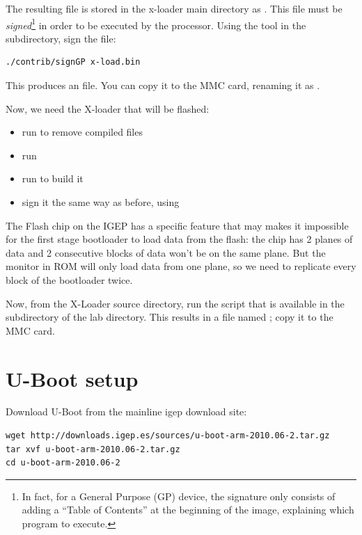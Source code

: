 The resulting file is stored in the x-loader main directory as
. This file must be {\em signed}\footnote{In fact,
  for a General Purpose (GP) device, the signature only consists of
  adding a “Table of Contents” at the beginning of the image,
  explaining which program to execute.} in order to be executed by the
processor. Using the  tool in the 
subdirectory, sign the  file:

\begin{verbatim}
./contrib/signGP x-load.bin
\end{verbatim}

This produces an  file. You can copy it to the
MMC card, renaming it as .

Now, we need the X-loader that will be flashed:

\begin{itemize}

\item run  to remove compiled files
\item run 
\item run  to build it
\item sign it the same way as before, using 

\end{itemize}

The Flash chip on the IGEP has a specific feature that may makes it
impossible for the first stage bootloader to load data from the flash:
the chip has 2 planes of data and 2 consecutive blocks of data won't
be on the same plane. But the monitor in ROM will only load data from
one plane, so we need to replicate every block of the bootloader
twice.

Now, from the X-Loader source directory, run the 
script that is available in the  subdirectory of the lab
directory. This results in a file named  ;
copy it to the MMC card.

\section{U-Boot setup}

Download U-Boot from the mainline igep download site:

\begin{verbatim}
wget http://downloads.igep.es/sources/u-boot-arm-2010.06-2.tar.gz
tar xvf u-boot-arm-2010.06-2.tar.gz
cd u-boot-arm-2010.06-2
\end{verbatim}

